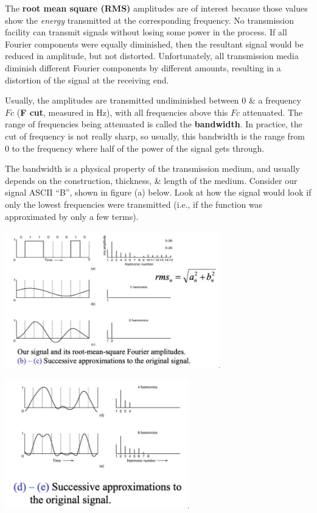 \documentclass[11pt]{article}
\begin{document}
The \textbf{root mean square (RMS)} amplitudes are of interest because those values show the \textit{energy} transmitted at the corresponding frequency. 
No transmission facility can transmit signals without losing some power in the process. 
If all Fourier components were equally diminished, then the resultant signal would be reduced in amplitude, but not distorted. 
Unfortunately, all transmission media diminish different Fourier components by different amounts, resulting in a distortion of the signal at the receiving end. 

Usually, the amplitudes are transmitted undiminished between $0$ \& a frequency $Fc$ (\textbf{F cut}, measured in Hz), with
all frequencies above this $Fc$ attenuated. 
The range of frequencies being attenuated is called the \textbf{bandwidth}. 
In practice, the cut of frequency is not really sharp, so usually, this bandwidth is the range from $0$ to the frequency where 
half of the power of the signal gets through. 

The bandwidth is a physical property of the transmission medium, and usually depends on the construction, thickness, \& length 
of the medium. 
Consider our signal ASCII ``B'', shown in figure (a) below. 
Look at how the signal would look if only the lowest frequencies were transmitted (i.e., if the function was approximated by only a few terms). 

\begin{center}
    \includegraphics[width=0.7\textwidth]{rms1.png}
\end{center}

\begin{center}
    \includegraphics[width=0.6\textwidth]{rms2.png}
\end{center}
\end{document}
